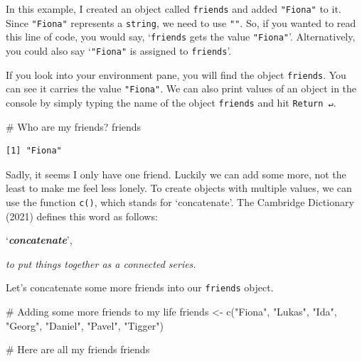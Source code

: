 \documentclass[
  letterpaper,
]{krantz}
\makeatletter
\newenvironment{Shaded}{\begin{snugshade}}{\end{snugshade}}
\newcommand{\CommentTok}[1]{\textcolor[rgb]{0.37,0.37,0.37}{#1}}
\newcommand{\FunctionTok}[1]{\textcolor[rgb]{0.28,0.35,0.67}{#1}}
\newcommand{\NormalTok}[1]{\textcolor[rgb]{0.00,0.23,0.31}{#1}}
\newcommand{\OtherTok}[1]{\textcolor[rgb]{0.00,0.23,0.31}{#1}}
\newcommand{\StringTok}[1]{\textcolor[rgb]{0.13,0.47,0.30}{#1}}
\renewenvironment{quote}{\begin{VF}}{\end{VF}}
\newenvironment{kframe}{%
\medskip{}
\setlength{\fboxsep}{.8em}
 \def\at@end@of@kframe{}%
 \ifinner\ifhmode%
  \def\at@end@of@kframe{\end{minipage}}%
  \begin{minipage}{\columnwidth}%
 \fi\fi%
 \def\FrameCommand##1{\hskip\@totalleftmargin \hskip-\fboxsep
 \colorbox{shadecolor}{##1}\hskip-\fboxsep
     \hskip-\linewidth \hskip-\@totalleftmargin \hskip\columnwidth}%
 \MakeFramed {\advance\hsize-\width
   \@totalleftmargin\z@ \linewidth\hsize
   \@setminipage}}%
 {\par\unskip\endMakeFramed%
 \at@end@of@kframe}
\renewenvironment{Shaded}{\begin{kframe}}{\end{kframe}}
\makeatother
\begin{document}
In this example, I created an object called \texttt{friends} and added
\texttt{"Fiona"} to it. Since \texttt{"Fiona"} represents a
\texttt{string}, we need to use \texttt{""}. So, if you wanted to read
this line of code, you would say, `\texttt{friends} gets the value
\texttt{"Fiona"}'. Alternatively, you could also say `\texttt{"Fiona"}
is assigned to \texttt{friends}'.

If you look into your environment pane, you will find the object
\texttt{friends}. You can see it carries the value \texttt{"Fiona"}. We
can also print values of an object in the console by simply typing the
name of the object \texttt{friends} and hit \texttt{Return\ ↵}.

\begin{Shaded}
\begin{Highlighting}[]
\CommentTok{\# Who are my friends?}
\NormalTok{friends}
\end{Highlighting}
\end{Shaded}

\begin{verbatim}
[1] "Fiona"
\end{verbatim}

Sadly, it seems I only have one friend. Luckily we can add some more,
not the least to make me feel less lonely. To create objects with
multiple values, we can use the function \texttt{c()}, which stands for
`concatenate'. The Cambridge Dictionary (2021) defines this word as
follows:

\begin{quote}
`\textbf{\emph{concatenate}}',

\emph{to put things together as a connected series.}
\end{quote}

Let's concatenate some more friends into our \texttt{friends} object.

\begin{Shaded}
\begin{Highlighting}[]
\CommentTok{\# Adding some more friends to my life}
\NormalTok{friends }\OtherTok{\textless{}{-}} \FunctionTok{c}\NormalTok{(}\StringTok{"Fiona"}\NormalTok{,}
             \StringTok{"Lukas"}\NormalTok{,}
             \StringTok{"Ida"}\NormalTok{,}
             \StringTok{"Georg"}\NormalTok{,}
             \StringTok{"Daniel"}\NormalTok{,}
             \StringTok{"Pavel"}\NormalTok{,}
             \StringTok{"Tigger"}\NormalTok{)}

\CommentTok{\# Here are all my friends}
\NormalTok{friends}
\end{Highlighting}
\end{Shaded}
\end{document}
